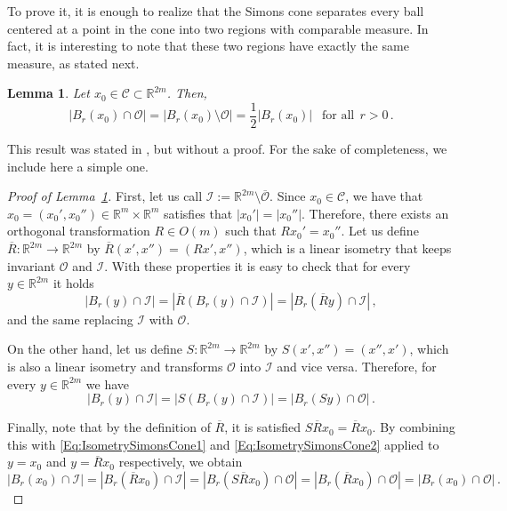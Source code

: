 \documentclass[12pt,reqno]{amsart}
\newtheorem{lemma}[theorem]{Lemma}
\theoremstyle{definition}
\theoremstyle{remark}
\newcommand{\con}[1]{\mathbb{#1}}
\newcommand{\R}{\con{R}} %
\newcommand{\ccal}{\mathscr{C}}
\newcommand{\ical}{\mathcal{I}}
\newcommand{\ocal}{\mathcal{O}}
\numberwithin{equation}{section}
\begin{document}
To prove it, it is enough to realize that the Simons cone separates every ball centered at a point in the cone into two regions with comparable measure. In fact, it is interesting to note that these two regions have exactly the same measure, as stated next.

\begin{lemma}
\label{Lemma:HalfBallSimonsCone}
Let $x_0\in \ccal\subset \R^{2m}$. Then, 
$$ | B_r(x_0)\cap \ocal| = | B_r(x_0)\setminus \ocal| = \frac{1}{2} |B_r(x_0)| \ \ \textrm{ for all} \ \ r>0\,. $$
\end{lemma}

This result was stated in \cite{Cabre-Saddle}, but without a proof. For the sake of completeness, we include here a simple one.

\begin{proof}[Proof of Lemma~\ref{Lemma:HalfBallSimonsCone}]
First, let us call $\ical := \R^{2m}\setminus \overline{\ocal}$. Since $x_0\in \ccal$, we have that $x_0 = (x_0',x_0'')\in \R^m \times \R^m$ satisfies that $|x_0'|=|x_0''|$. Therefore, there exists an orthogonal transformation $R\in O(m)$ such that $R  x_0' = x_0''$. Let us define $\overline{R}:\R^{2m}\to\R^{2m}$ by $\overline{R}(x',x'') = (R x',x'')$, which is a linear isometry that keeps invariant $\ocal$ and $\ical$. With these properties it is easy to check that for every $y\in \R^{2m}$ it holds
\begin{equation}
\label{Eq:IsometrySimonsCone1}
|B_r(y)\cap \ical| = |\overline{R} \left( B_r(y)\cap \ical\right)| = | B_r(\overline{R}y) \cap \ical |\,,
\end{equation}
and the same replacing $\ical$ with $\ocal$.

On the other hand, let us define $S:\R^{2m}\to\R^{2m}$ by $S(x',x'') = (x'',x')$, which is also a linear isometry and transforms $\ocal$ into $\ical$ and vice versa. Therefore, for every $y\in \R^{2m}$ we have
\begin{equation}
\label{Eq:IsometrySimonsCone2}
|B_r(y)\cap \ical| = |S \left( B_r(y)\cap \ical\right)| = | B_r(Sy) \cap \ocal |\,.
\end{equation}

Finally, note that by the definition of $\overline{R}$, it is satisfied $S\overline{R} x_0 = \overline{R} x_0$. By combining this with \eqref{Eq:IsometrySimonsCone1} and \eqref{Eq:IsometrySimonsCone2} applied to $y=x_0$ and $y=\overline{R}x_0$ respectively, we obtain
$$ |B_r(x_0)\cap \ical| = | B_r(\overline{R}x_0) \cap \ical | = | B_r(S\overline{R}x_0) \cap \ocal | = | B_r(\overline{R}x_0) \cap \ocal | = |B_r(x_0)\cap \ocal|\,. $$
\end{proof}
\end{document}
